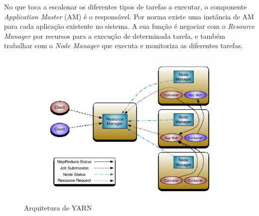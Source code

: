 No que toca a escalonar os diferentes tipos de tarefas a executar, o componente \textit{Application Master} (AM) é o responsável. Por norma existe uma instância de AM para cada aplicação existente no sistema. A sua função é negociar com o \textit{Resource Manager} por recursos para a execução de determinada tarefa, e também trabalhar com o \textit{Node Manager} que executa e monitoriza as diferentes tarefas.

\begin{figure}[htbp]
	\centering
	\includegraphics[height=3in]{LaTeX/Chapters/Figures/yarn.png}
    
  \caption{Arquitetura de YARN \cite{yarn}}
  \label{fig:yarn-architeture}
\end{figure}


